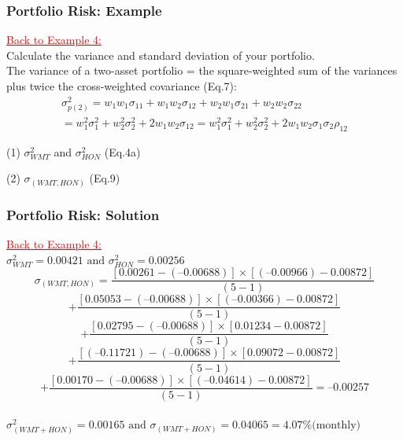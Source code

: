 \documentclass[9pt,aspectratio=169]{beamer}
\begin{document}
\begin{frame}
\frametitle{\textnormal{Portfolio Risk: Example}}

\textcolor{red}{\underline{Back to Example 4:}}
\\
\vspace{6pt}
Calculate the variance and standard deviation of your portfolio.
\\
The variance of a two-asset portfolio = the square-weighted sum of the variances plus twice the cross-weighted covariance (Eq.7):
\\
\vspace{-4pt}
\begin{align}
    \sigma_{p(2)}^2= w_1 w_1 \sigma_{11} + w_1 w_2 \sigma_{12} + w_2 w_1 \sigma_{21} + w_2 w_2 \sigma_{22} \\
= w_1^2 \sigma_1^2+w_2^2 \sigma_2^2+2w_1 w_2 \sigma_{12} = w_1^2 \sigma_1^2+w_2^2 \sigma_2^2+2w_1 w_2 \sigma_1 \sigma_2 \rho_{12}   
\end{align}
\vspace{-2pt}

\vspace{6pt}
\setlength{\parindent}{0.5cm}
(1) $\sigma_{WMT}^2$ and $\sigma_{HON}^2$ (Eq.4a)

\vspace{6pt}
(2) $\sigma_{(WMT,HON)}$ (Eq.9)

\end{frame}

\begin{frame}
\frametitle{\textnormal{Portfolio Risk: Solution}}

\textcolor{red}{\underline{Back to Example 4:}}
\\
\vspace{6pt}
$
\sigma_{WMT}^2 = 0.00421 \text{ and } \sigma_{HON}^2=0.00256   $
\\
$$\sigma_{(WMT,HON)}= \frac{[0.00261 - (\text{--}0.00688)] \times [(\text{--}0.00966)-0.00872]}{(5-1)}
$$
$$ + \frac{[0.05053 - (\text{--}0.00688)] \times [(\text{--}0.00366)- 0.00872]}{(5 - 1)}$$
$$+ \frac{[0.02795 - (\text{--}0.00688)] \times [0.01234 - 0.00872]}{(5 - 1)}$$
$$+ \frac{[(\text{--}0.11721) - (\text{--}0.00688)] \times [0.09072 - 0.00872]}{(5 - 1)}$$
$$+ \frac {[0.00170 - (\text{--}0.00688)] \times [(\text{--}0.04614) - 0.00872]}{(5 - 1)}=\text{--}0.00257$$
\\
$\sigma_{(WMT+HON)}^2=0.00165 \text{ and } \sigma_{(WMT+HON)}=0.04065=4.07\% \text{(monthly)} $

\end{frame}
\end{document}
